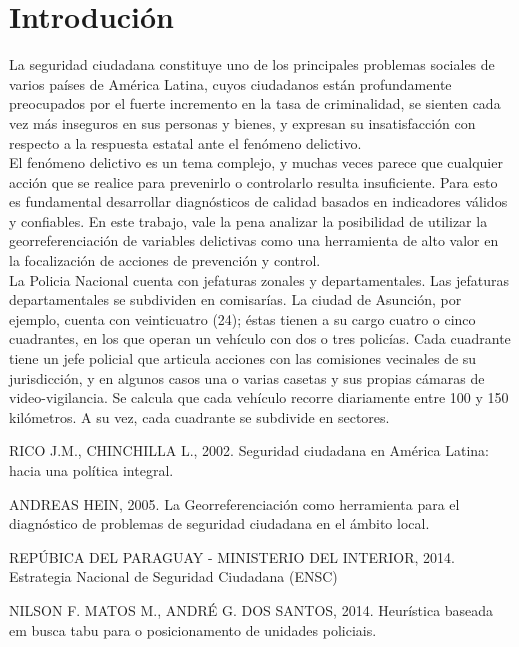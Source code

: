 \documentclass[format=acmsmall, screen=true, review=false]{acmart}
\begin{document}
\section{Introdución}
La seguridad ciudadana constituye uno de los principales problemas sociales de varios países de América Latina, cuyos ciudadanos están profundamente preocupados por el fuerte incremento en la tasa de criminalidad, se sienten cada vez más inseguros en sus personas y bienes, y expresan su insatisfacción con respecto a la respuesta estatal ante el fenómeno delictivo\cite{SEGURIDAD-2002}.\\
El fenómeno delictivo es un tema complejo, y muchas veces parece que cualquier acción que se realice para prevenirlo o controlarlo resulta insuficiente. Para esto es fundamental desarrollar diagnósticos de calidad basados en indicadores válidos y confiables.  En este trabajo, vale la pena analizar la posibilidad de utilizar la georreferenciación de variables delictivas como una herramienta de alto valor en la focalización de acciones de prevención y control\cite{ENSC-2014}.\\
La Policia Nacional cuenta con jefaturas zonales y departamentales. Las jefaturas departamentales se subdividen en comisarías. La ciudad de Asunción, por ejemplo, cuenta con veinticuatro (24); éstas tienen a su cargo cuatro o cinco cuadrantes, en los que operan un vehículo con dos o tres policías. Cada cuadrante tiene un jefe policial que articula acciones con las comisiones vecinales de su jurisdicción, y en algunos casos una o varias casetas y sus propias cámaras de video-vigilancia. Se calcula que cada vehículo recorre diariamente entre 100 y 150 kilómetros. A su vez, cada cuadrante se subdivide en sectores\cite{GEOREFERENCIA-2005}.

\begin{thebibliography}{43}

RICO J.M., CHINCHILLA L., 2002. Seguridad ciudadana en América Latina: hacia una política integral.

ANDREAS HEIN, 2005. La Georreferenciación como herramienta para el diagnóstico de problemas de seguridad ciudadana en el ámbito local.

REPÚBICA DEL PARAGUAY - MINISTERIO DEL INTERIOR, 2014. Estrategia Nacional de Seguridad Ciudadana (ENSC)

NILSON F. MATOS M., ANDRÉ G. DOS SANTOS, 2014. Heurística baseada em busca tabu para o posicionamento de unidades policiais.


\end{thebibliography}
\end{document}
